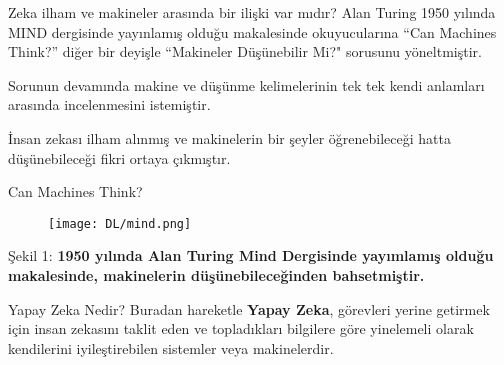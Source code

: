 \documentclass{beamer}                                                                                          %
\begin{document}
    \begin{frame}{ Zeka ilham ve makineler arasında bir ilişki var mıdır?}
        \justifying
            \color{myred1} \color{black}Alan Turing 1950 yılında MIND dergisinde yayınlamış olduğu makalesinde okuyucularına  “Can Machines Think?” diğer bir deyişle “Makineler Düşünebilir Mi?" sorusunu yöneltmiştir.\par \vspace{10}
            \color{myred1} \color{black}Sorunun devamında makine ve düşünme kelimelerinin tek tek kendi anlamları arasında incelenmesini istemiştir.\par \vspace{10}
            \color{myred1} \color{black}İnsan zekası ilham alınmış ve makinelerin bir şeyler öğrenebileceği hatta düşünebileceği fikri ortaya çıkmıştır.
    \end{frame}
    

	\begin{frame}{Can Machines Think?}
        \begin{center}
            \begin{figure}
                \hspace*{-14.5 pt}
                \centering
                \texttt{[image: DL/mind.png]}
            \end{figure}
        \end{center}
        \centering
        \color{myred1}Şekil 1:\color{black}\textbf{ 1950 yılında Alan Turing Mind Dergisinde yayımlamış olduğu makalesinde, makinelerin düşünebileceğinden bahsetmiştir.}
	\end{frame}
	
    
    \begin{frame}{Yapay Zeka Nedir?}
        \justifying
            Buradan hareketle  \textbf{\color{myred1}Yapay Zeka\color{black}}, görevleri yerine getirmek için insan zekasını taklit eden ve topladıkları bilgilere göre yinelemeli olarak kendilerini iyileştirebilen sistemler veya makinelerdir.

    \end{frame}
    
	
\end{document}
